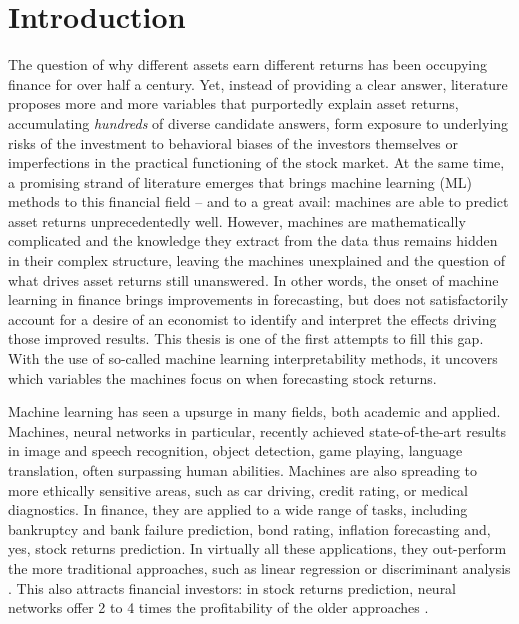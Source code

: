 \chapter{Introduction}
\label{chap:int}

The question of why different assets earn different returns has been occupying finance for over half a century. Yet, instead of providing a clear answer, literature proposes more and more variables that purportedly explain asset returns, accumulating \textit{hundreds} of diverse candidate answers, form exposure to underlying risks of the investment to behavioral biases of the investors themselves or imperfections in the practical functioning of the stock market. At the same time, a promising strand of literature emerges that brings machine learning (ML) methods to this financial field -- and to a great avail: machines are able to predict asset returns unprecedentedly well. However, machines are mathematically complicated and the knowledge they extract from the data thus remains hidden in their complex structure, leaving the machines unexplained and the question of what drives asset returns still unanswered. In other words, the onset of machine learning in finance brings improvements in forecasting, but does not satisfactorily account for a desire of an economist to identify and interpret the effects driving those improved results. This thesis is one of the first attempts to fill this gap. With the use of so-called machine learning interpretability methods, it uncovers which variables the machines focus on when forecasting stock returns. 

Machine learning has seen a upsurge in many fields, both academic and applied. Machines, neural networks in particular, recently achieved state-of-the-art results in image and speech recognition, object detection, game playing, language translation, often surpassing human abilities. Machines are also spreading to more ethically sensitive areas, such as car driving, credit rating, or medical diagnostics. In finance, they are applied to a wide range of tasks, including bankruptcy and bank failure prediction, bond rating, inflation forecasting and, yes, stock returns prediction. In virtually all these applications, they out-perform the more traditional approaches, such as linear regression or discriminant analysis \citep{fadlalla2001analysis}. This also attracts financial investors: in stock returns prediction, neural networks offer 2 to 4 times the profitability of the older approaches \citep{gu2020empirical, tobek2020does}.  


